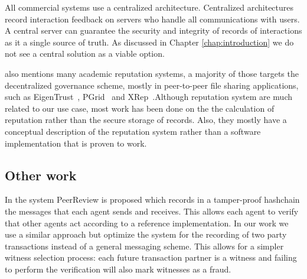 All commercial systems use a centralized
architecture. Centralized architectures record interaction feedback on servers who handle all 
communications with users. A central server can guarantee the security and integrity of records of
interactions as it a single source of truth. As discussed in Chapter \ref{chap:introduction} we do
not see a central solution as a viable option. 

\cite{HENDRIKX2015184} also mentions many academic reputation systems, a majority of those targets 
the decentralized governance scheme, mostly in peer-to-peer file sharing applications, such as EigenTrust~\cite{kamvar2003eigentrust},
PGrid~\cite{aberer2003p} and XRep~\cite{damiani2002xrep}.Although reputation system are much related to our use case, most work has been done on the 
the calculation of reputation rather than the secure storage of records. Also, they mostly have a
conceptual description of the reputation system rather than a software implementation that is proven
to work.

\subsection{Other work}
In \cite{haeberlen2007peerreview} the system PeerReview is proposed which records in a tamper-proof
hashchain the messages that each agent sends and receives. This allows each agent to verify that 
other agents act according to a reference implementation. In our work we use a similar approach but
optimize the system for the recording of two party transactions instead of a general messaging scheme.
This allows for a simpler witness selection process: each future transaction partner is a witness and
failing to perform the verification will also mark witnesses as a fraud.






